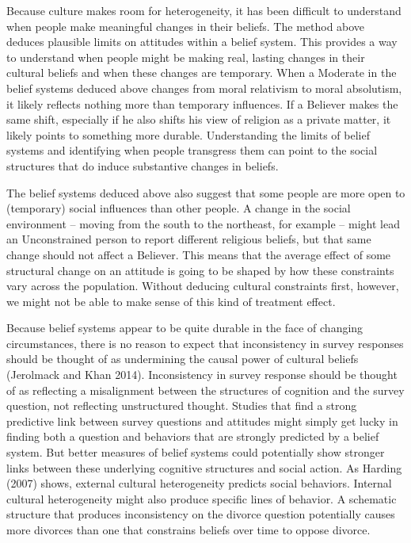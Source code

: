 \documentclass[12pt,]{article}
\begin{document}
Because culture makes room for heterogeneity, it has been difficult to understand when people make meaningful changes in their beliefs. The method above deduces plausible limits on attitudes within a belief system. This provides a way to understand when people might be making real, lasting changes in their cultural beliefs and when these changes are temporary. When a Moderate in the belief systems deduced above changes from moral relativism to moral absolutism, it likely reflects nothing more than temporary influences. If a Believer makes the same shift, especially if he also shifts his view of religion as a private matter, it likely points to something more durable. Understanding the limits of belief systems and identifying when people transgress them can point to the social structures that do induce substantive changes in beliefs.

The belief systems deduced above also suggest that some people are more open to (temporary) social influences than other people. A change in the social environment -- moving from the south to the northeast, for example -- might lead an Unconstrained person to report different religious beliefs, but that same change should not affect a Believer. This means that the average effect of some structural change on an attitude is going to be shaped by how these constraints vary across the population. Without deducing cultural constraints first, however, we might not be able to make sense of this kind of treatment effect.

Because belief systems appear to be quite durable in the face of changing circumstances, there is no reason to expect that inconsistency in survey responses should be thought of as undermining the causal power of cultural beliefs (Jerolmack and Khan 2014). Inconsistency in survey response should be thought of as reflecting a misalignment between the structures of cognition and the survey question, not reflecting unstructured thought. Studies that find a strong predictive link between survey questions and attitudes might simply get lucky in finding both a question and behaviors that are strongly predicted by a belief system. But better measures of belief systems could potentially show stronger links between these underlying cognitive structures and social action. As Harding (2007) shows, external cultural heterogeneity predicts social behaviors. Internal cultural heterogeneity might also produce specific lines of behavior. A schematic structure that produces inconsistency on the divorce question potentially causes more divorces than one that constrains beliefs over time to oppose divorce.
\end{document}
